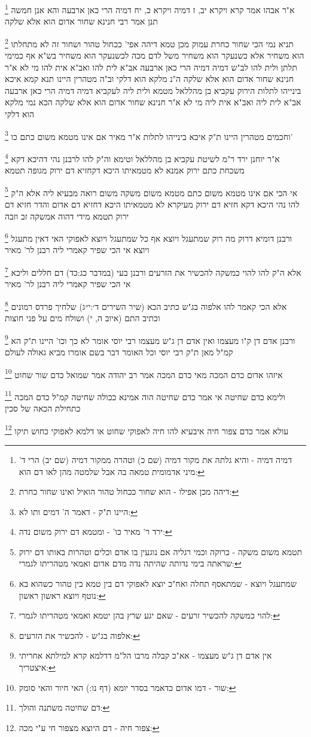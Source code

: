 \documentclass[12pt, openany]{book}
\newcommand{\footnotecomment}[1]{
	\renewcommand\thefootnote{}
	\footnote{#1}}
\newcommand{\commenta}[1]{\footnotecomment{#1}}
\begin{document}
{\commenta{דמיה דמיה - והיא גלתה את מקור דמיה (שם כ) וטהרה ממקור דמיה (שם יב) הרי ד' מיני אדמומית טמאה בה אבל שלמטה מהן לאו דם הוא:}
א"ר אבהו אמר קרא {ויקרא יב, ז} דמיה {ויקרא כ, יח} דמיה הרי כאן ארבעה 
והא אנן חמשה תנן אמר רבי חנינא שחור אדום הוא אלא שלקה 
\commenta{דיהה מכן אפילו - הוא שחור ככחול טהור הואיל ואינו שחור כחרת:}
תניא נמי הכי שחור כחרת עמוק מכן טמא דיהה אפי' ככחול טהור ושחור זה לא מתחלתו הוא משחיר אלא כשנעקר הוא משחיר משל לדם מכה לכשנעקר הוא משחיר
בש"א אף כמימי תלתן ולית להו לב"ש דמיה דמיה הרי כאן ארבעה 
אב"א לית להו ואב"א אית להו מי לא א"ר חנינא שחור אדום הוא אלא שלקה ה"נ מלקא הוא דלקי
וב"ה מטהרין היינו תנא קמא 
איכא בינייהו
לתלות 
הירוק עקביא בן מהללאל מטמא ולית ליה לעקביא דמיה דמיה הרי כאן ארבעה 
אב"א לית ליה ואב"א אית ליה מי לא א"ר חנינא שחור אדום הוא אלא שלקה הכא נמי מלקא הוא דלקי
\commenta{היינו ת"ק - דאמר ה' דמים ותו לא:}
וחכמים מטהרין היינו ת"ק איכא בינייהו לתלות
א"ר מאיר אם אינו מטמא משום כתם כו'
\commenta{ירד ר' מאיר כו' - ומטמא דם ירוק משום נדה:}
א"ר יוחנן ירד ר"מ לשיטת עקביא בן מהללאל וטימא וה"ק להו לרבנן נהי דהיכא דקא משכחת כתם ירוק אמנא לא מטמאיתו היכא דקחזיא דם ירוק מגופה תטמא 
\commenta{תטמא משום משקה - כרוקה וכמי רגליה אם נוגעין בו אדם וכלים וטהרות באותו דם ירוק שראתה בימי נדותה שהיתה נדה מדם אדום ואמאי מטהריתו לגמרי:}
אי הכי אם אינו מטמא משום כתם מטמא משום משקה משום רואה מבעיא ליה 
אלא ה"ק להו נהי היכא דקא חזיא דם ירוק מעיקרא לא מטמאיתו היכא דחזיא דם אדום והדר חזיא דם ירוק תטמא מידי דהוה אמשקה זב וזבה 
\commenta{שמתעגל ויוצא - שמתאסף תחלה ואח"כ יוצא לאפוקי דם בין טמא בין טהור כשהוא בא נוטף ויוצא ראשון ראשון:}
ורבנן דומיא דרוק מה רוק שמתעגל ויוצא אף כל שמתעגל ויוצא לאפוקי האי דאין מתעגל ויוצא אי הכי שפיר קאמרי ליה רבנן לר' מאיר 
\commenta{להוי כמשקה להכשיר זרעים - שאם יגע שרץ בהן יטמא ואמאי מטהריתו לגמרי:}
אלא ה"ק להו להוי כמשקה להכשיר את הזרעים ורבנן בעי (במדבר כג:כד) דם חללים וליכא אי הכי שפיר קאמרי ליה רבנן לר' מאיר 
\commenta{אלפוה בג"ש - להכשיר את הזרעים:}
אלא הכי קאמר להו אלפוה בג"ש כתיב הכא (שיר השירים ד׳:י״ג) שלחיך פרדס רמונים וכתיב התם (איוב ה, י) ושולח מים על פני חוצות 
\commenta{אין אדם דן ג"ש מעצמו - אא"כ קבלה מרבו הל"מ דדלמא קרא למילתא אחריתי איצטריך:}
ורבנן אדם דן ק"ו מעצמו ואין אדם דן ג"ש מעצמו
רבי יוסי אומר לא כך וכו' היינו ת"ק הא קמ"ל מאן ת"ק רבי יוסי וכל האומר דבר בשם אומרו מביא גאולה לעולם
\commenta{שור - דמו אדום כדאמר בסדר יומא (דף נו:) האי חיור והאי סומק: }
איזהו אדום כדם המכה מאי כדם המכה אמר רב יהודה אמר שמואל כדם שור שחוט 
\commenta{דם שחיטה משתנה והולך:}
ולימא כדם שחיטה אי אמר כדם שחיטה הוה אמינא ככולה שחיטה קמ"ל כדם המכה כתחילת הכאה של סכין 
\commenta{צפור חיה - דם היוצא מצפור חי ע"י מכה:}
עולא אמר כדם צפור חיה איבעיא להו חיה לאפוקי שחוט או דלמא לאפוקי כחוש תיקו 
}
\end{document}
